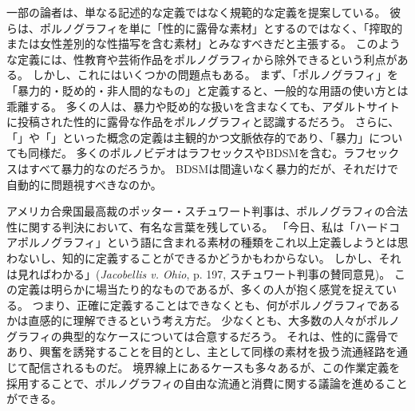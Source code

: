 \documentclass[paper=a4,book,openany]{jlreq}
\begin{document}
一部の論者は、単なる記述的な定義ではなく規範的な定義を提案している。
彼らは、ポルノグラフィを単に「性的に露骨な素材」とするのではなく、「搾取的または女性差別的な性描写を含む素材」とみなすべきだと主張する。
このような定義には、性教育や芸術作品をポルノグラフィから除外できるという利点がある。
しかし、これにはいくつかの問題点もある。
まず、「ポルノグラフィ」を「暴力的・貶め的・非人間的なもの」と定義すると、一般的な用語の使い方とは乖離する。
多くの人は、暴力や貶め的な扱いを含まなくても、アダルトサイトに投稿された性的に露骨な作品をポルノグラフィと認識するだろう。
さらに、「」や「」といった概念の定義は主観的かつ文脈依存的であり、「暴力」についても同様だ。
多くのポルノビデオはラフセックスやBDSMを含む。ラフセックスはすべて暴力的なのだろうか。
BDSMは間違いなく暴力的だが、それだけで自動的に問題視すべきなのか。

アメリカ合衆国最高裁のポッター・スチュワート判事は、ポルノグラフィの合法性に関する判決において、有名な言葉を残している。
「今日、私は「ハードコアポルノグラフィ」という語に含まれる素材の種類をこれ以上定義しようとは思わないし、知的に定義することができるかどうかもわからない。
しかし、それは見ればわかる」(\emph{Jacobellis v. Ohio}, p. 197, スチュワート判事の賛同意見)。
この定義は明らかに場当たり的なものであるが、多くの人が抱く感覚を捉えている。
つまり、正確に定義することはできなくとも、何がポルノグラフィであるかは直感的に理解できるという考え方だ。
少なくとも、大多数の人々がポルノグラフィの典型的なケースについては合意するだろう。
それは、性的に露骨であり、興奮を誘発することを目的とし、主として同様の素材を扱う流通経路を通じて配信されるものだ。
境界線上にあるケースも多々あるが、この作業定義を採用することで、ポルノグラフィの自由な流通と消費に関する議論を進めることができる。
\end{document}
